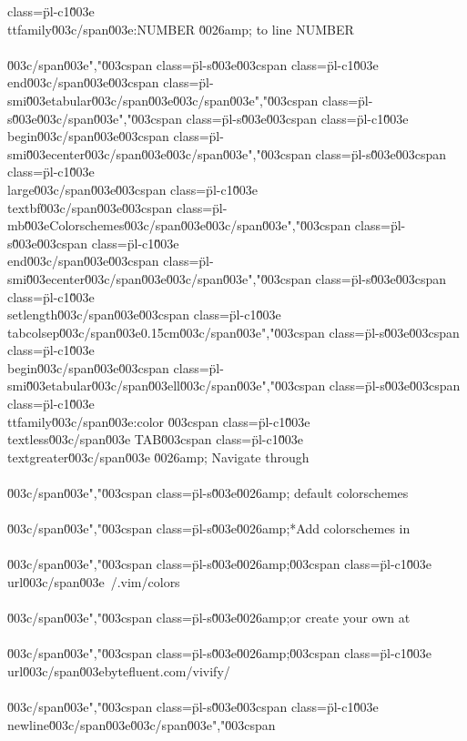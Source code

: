class=\"pl-c1\"\u003e\\ttfamily\u003c/span\u003e{:NUMBER} \u0026amp; to line NUMBER\\\\\u003c/span\u003e","\u003cspan class=\"pl-s\"\u003e\u003cspan class=\"pl-c1\"\u003e\\end\u003c/span\u003e{\u003cspan class=\"pl-smi\"\u003etabular\u003c/span\u003e}\u003c/span\u003e","\u003cspan class=\"pl-s\"\u003e\u003c/span\u003e","\u003cspan class=\"pl-s\"\u003e\u003cspan class=\"pl-c1\"\u003e\\begin\u003c/span\u003e{\u003cspan class=\"pl-smi\"\u003ecenter\u003c/span\u003e}\u003c/span\u003e","\u003cspan class=\"pl-s\"\u003e\u003cspan class=\"pl-c1\"\u003e\\large\u003c/span\u003e\u003cspan class=\"pl-c1\"\u003e\\textbf\u003c/span\u003e{\u003cspan class=\"pl-mb\"\u003eColorschemes\u003c/span\u003e}\u003c/span\u003e","\u003cspan class=\"pl-s\"\u003e\u003cspan class=\"pl-c1\"\u003e\\end\u003c/span\u003e{\u003cspan class=\"pl-smi\"\u003ecenter\u003c/span\u003e}\u003c/span\u003e","\u003cspan class=\"pl-s\"\u003e\u003cspan class=\"pl-c1\"\u003e\\setlength\u003c/span\u003e{\u003cspan class=\"pl-c1\"\u003e\\tabcolsep\u003c/span\u003e}{0.15cm}\u003c/span\u003e","\u003cspan class=\"pl-s\"\u003e\u003cspan class=\"pl-c1\"\u003e\\begin\u003c/span\u003e{\u003cspan class=\"pl-smi\"\u003etabular\u003c/span\u003e}{ll}\u003c/span\u003e","\u003cspan class=\"pl-s\"\u003e\u003cspan class=\"pl-c1\"\u003e\\ttfamily\u003c/span\u003e{:color \u003cspan class=\"pl-c1\"\u003e\\textless\u003c/span\u003e TAB\u003cspan class=\"pl-c1\"\u003e\\textgreater\u003c/span\u003e} \u0026amp; Navigate through\\\\\u003c/span\u003e","\u003cspan class=\"pl-s\"\u003e\u0026amp; default colorschemes\\\\\u003c/span\u003e","\u003cspan class=\"pl-s\"\u003e\u0026amp;*Add colorschemes in\\\\\u003c/span\u003e","\u003cspan class=\"pl-s\"\u003e\u0026amp;\u003cspan class=\"pl-c1\"\u003e\\url\u003c/span\u003e{~/.vim/colors}\\\\\u003c/span\u003e","\u003cspan class=\"pl-s\"\u003e\u0026amp;or create your own at\\\\\u003c/span\u003e","\u003cspan class=\"pl-s\"\u003e\u0026amp;\u003cspan class=\"pl-c1\"\u003e\\url\u003c/span\u003e{bytefluent.com/vivify/}\\\\\u003c/span\u003e","\u003cspan class=\"pl-s\"\u003e\u003cspan class=\"pl-c1\"\u003e\\newline\u003c/span\u003e\u003c/span\u003e","\u003cspan 